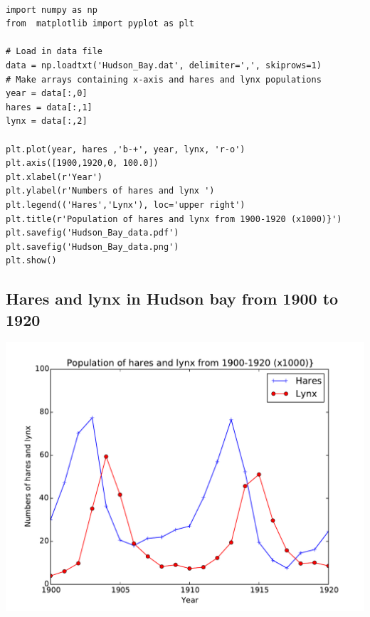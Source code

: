 \documentclass[%
oneside,                 %
final,                   %
10pt]{article}
\begin{document}
\paragraph{}
\begin{verbatim}
import numpy as np
from  matplotlib import pyplot as plt

# Load in data file
data = np.loadtxt('Hudson_Bay.dat', delimiter=',', skiprows=1)
# Make arrays containing x-axis and hares and lynx populations
year = data[:,0]
hares = data[:,1]
lynx = data[:,2]

plt.plot(year, hares ,'b-+', year, lynx, 'r-o')
plt.axis([1900,1920,0, 100.0])
plt.xlabel(r'Year')
plt.ylabel(r'Numbers of hares and lynx ')
plt.legend(('Hares','Lynx'), loc='upper right')
plt.title(r'Population of hares and lynx from 1900-1920 (x1000)}')
plt.savefig('Hudson_Bay_data.pdf')
plt.savefig('Hudson_Bay_data.png')
plt.show()
\end{verbatim}



\subsection*{Hares and lynx in Hudson bay from 1900 to 1920}



\vspace{6mm}

\centerline{\includegraphics[width=0.9\linewidth]{fig/Hudson_Bay_data.pdf}}

\vspace{6mm}
\end{document}
